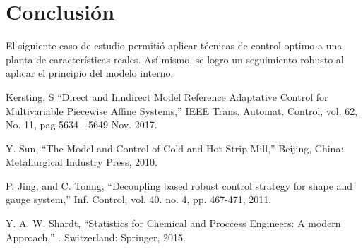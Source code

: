 \documentclass[journal,twoside,web]{ieeecolor}
\begin{document}
\section{Conclusión}

El siguiente caso de estudio permitió aplicar técnicas de control optimo a una planta de características reales. Así mismo, se logro un seguimiento robusto al aplicar el principio del modelo interno.


\begin{thebibliography}{00}
	 Kersting, S ``Direct and Inndirect Model Reference Adaptative Control for Multivariable Piecewise Affine Systems,'' IEEE Trans. Automat. Control, vol. 62, No. 11, pag 5634 - 5649 Nov. 2017.
	
	 Y. Sun,  ``The Model and Control of Cold and Hot Strip Mill,'' Beijing, China: Metallurgical Industry Press, 2010.
	
	 P. Jing, and C. Tonng,  ``Decoupling based robust control strategy for shape and gauge system,'' Inf. Control, vol. 40. no. 4, pp. 467-471, 2011.
	
	 Y. A. W. Shardt,  ``Statistics for Chemical and Proccess Engineers: A modern Approach,'' . Switzerland: Springer, 2015.

\end{thebibliography}
\end{document}
